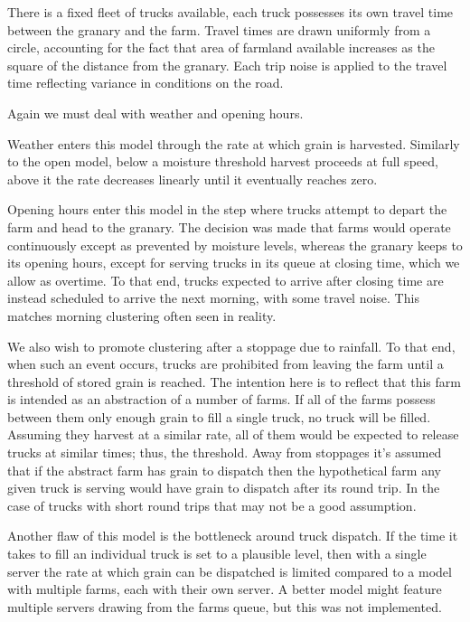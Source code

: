 \documentclass[a4paper, 10.5pt, oneside]{report}
\begin{document}
There is a fixed fleet of trucks available, each truck possesses its own travel time between the granary
and the farm. Travel times are drawn uniformly from a circle, accounting for the fact that area of farmland
available increases as the square of the distance from the granary. Each trip noise is applied to the travel
time reflecting variance in conditions on the road.

Again we must deal with weather and opening hours.

Weather enters this model through the rate at which grain is harvested. Similarly to the open model, below
a moisture threshold harvest proceeds at full speed, above it the rate decreases linearly until it eventually
reaches zero.

Opening hours enter this model in the step where trucks attempt to depart the farm and head to the granary.
The decision was made that farms would operate continuously except as prevented by moisture levels, whereas
the granary keeps to its opening hours, except for serving trucks in its queue at closing time,
which we allow as overtime. To that end, trucks expected to arrive after closing time are instead scheduled
to arrive the next morning, with some travel noise. This matches morning clustering often seen in reality.

We also wish to promote clustering after a stoppage due to rainfall. To that end, when such an event occurs,
trucks are prohibited from leaving the farm until a threshold of stored grain is reached. The intention
here is to reflect that this farm is intended as an abstraction of a number of farms. If all of the farms
possess between them only enough grain to fill a single truck, no truck will be filled. Assuming they harvest
at a similar rate, all of them would be expected to release trucks at similar times; thus, the threshold. Away from
stoppages it's assumed that if the abstract farm has grain to dispatch then the hypothetical farm any given
truck is serving would have grain to dispatch after its round trip. In the case of trucks with short round trips
that may not be a good assumption.

Another flaw of this model is the bottleneck around truck dispatch. If the time it takes to fill an individual truck
is set to a plausible level, then with a single server the rate at which grain can be dispatched is limited compared
to a model with multiple farms, each with their own server. A better model might feature multiple servers drawing
from the farms queue, but this was not implemented.
\end{document}

